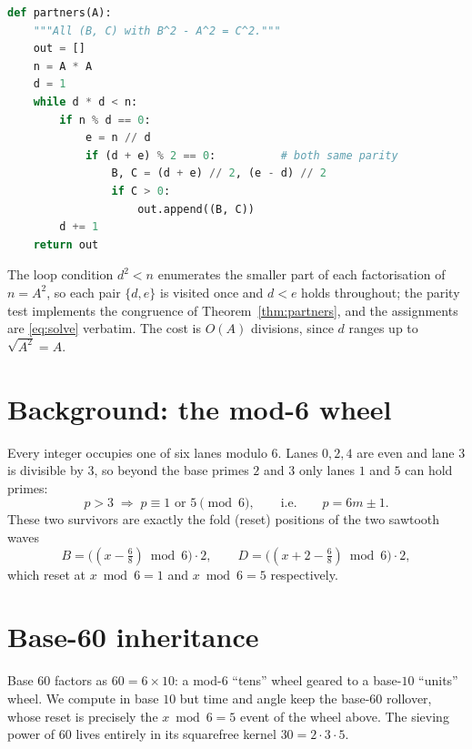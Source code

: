 \documentclass[11pt]{article}
\theoremstyle{definition}
\begin{document}
\begin{lstlisting}[language=Python]
def partners(A):
    """All (B, C) with B^2 - A^2 = C^2."""
    out = []
    n = A * A
    d = 1
    while d * d < n:
        if n % d == 0:
            e = n // d
            if (d + e) % 2 == 0:          # both same parity
                B, C = (d + e) // 2, (e - d) // 2
                if C > 0:
                    out.append((B, C))
        d += 1
    return out
\end{lstlisting}

The loop condition $d^2 < n$ enumerates the smaller part of each factorisation
of $n = A^2$, so each pair $\{d,e\}$ is visited once and $d<e$ holds
throughout; the parity test implements the congruence of
Theorem~\ref{thm:partners}, and the assignments are \eqref{eq:solve} verbatim.
The cost is $O(A)$ divisions, since $d$ ranges up to $\sqrt{A^2} = A$.

\section{Background: the mod-6 wheel}

Every integer occupies one of six lanes modulo $6$. Lanes
$0,2,4$ are even and lane $3$ is divisible by $3$, so beyond the base
primes $2$ and $3$ only lanes $1$ and $5$ can hold primes:
\[
p > 3 \;\Longrightarrow\; p \equiv 1 \text{ or } 5 \pmod 6,
\qquad\text{i.e.}\qquad p = 6m \pm 1 .
\]
These two survivors are exactly the fold (reset) positions of the two
sawtooth waves
\[
B = \bigl((x - \tfrac{6}{8}) \bmod 6\bigr)\cdot 2,
\qquad
D = \bigl((x + 2 - \tfrac{6}{8}) \bmod 6\bigr)\cdot 2 ,
\]
which reset at $x \bmod 6 = 1$ and $x \bmod 6 = 5$ respectively.

\section{Base-60 inheritance}

Base $60$ factors as $60 = 6 \times 10$: a mod-$6$ ``tens'' wheel geared to
a base-$10$ ``units'' wheel. We compute in base $10$ but time and angle
keep the base-$60$ rollover, whose reset is precisely the $x \bmod 6 = 5$
event of the wheel above. The sieving power of $60$ lives entirely in its
squarefree kernel $30 = 2\cdot 3\cdot 5$.
\end{document}
